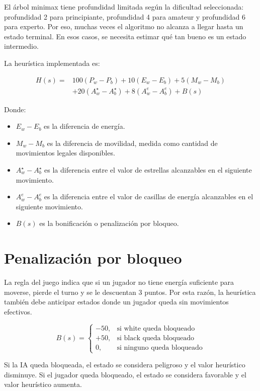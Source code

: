 \documentclass[12pt,letterpaper]{article}
\begin{document}
El árbol minimax tiene profundidad limitada según la dificultad seleccionada: profundidad 2 para principiante, profundidad 4 para amateur y profundidad 6 para experto. Por eso, muchas veces el algoritmo no alcanza a llegar hasta un estado terminal. En esos casos, se necesita estimar qué tan bueno es un estado intermedio.

La heurística implementada es:

\[
\begin{aligned}
H(s)=
&100(P_w-P_b)
+10(E_w-E_b)
+5(M_w-M_b)\\
&+20(A^\star_w-A^\star_b)
+8(A^e_w-A^e_b)
+B(s)
\end{aligned}
\]

\noindent Donde:

\begin{itemize}
    \item $E_w - E_b$ es la diferencia de energía.
    \item $M_w - M_b$ es la diferencia de movilidad, medida como cantidad de movimientos legales disponibles.
    \item $A^\star_w - A^\star_b$ es la diferencia entre el valor de estrellas alcanzables en el siguiente movimiento.
    \item $A^e_w - A^e_b$ es la diferencia entre el valor de casillas de energía alcanzables en el siguiente movimiento.
    \item $B(s)$ es la bonificación o penalización por bloqueo.
\end{itemize}

\section{Penalización por bloqueo}

La regla del juego indica que si un jugador no tiene energía suficiente para moverse, pierde el turno y se le descuentan 3 puntos. Por esta razón, la heurística también debe anticipar estados donde un jugador queda sin movimientos efectivos.

\[
B(s)=
\begin{cases}
-50, & \text{si white queda bloqueado}\\
+50, & \text{si black queda bloqueado}\\
0, & \text{si ninguno queda bloqueado}
\end{cases}
\]

\begin{tcolorbox}[colframe=KERed,title=\textbf{Importancia estratégica},coltitle=white,colbacktitle=KERed]
Si la IA queda bloqueada, el estado se considera peligroso y el valor heurístico disminuye. Si el jugador queda bloqueado, el estado se considera favorable y el valor heurístico aumenta.
\end{tcolorbox}
\end{document}
